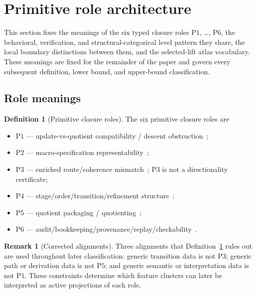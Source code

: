 \documentclass[11pt]{article}
\theoremstyle{definition}
\newtheorem{definition}[theorem]{Definition}
\newtheorem{remark}[theorem]{Remark}
\newcommand{\Pone}{\ensuremath{\mathrm{P1}}}
\newcommand{\Ptwo}{\ensuremath{\mathrm{P2}}}
\newcommand{\Pthree}{\ensuremath{\mathrm{P3}}}
\newcommand{\Pfour}{\ensuremath{\mathrm{P4}}}
\newcommand{\Pfive}{\ensuremath{\mathrm{P5}}}
\newcommand{\Psix}{\ensuremath{\mathrm{P6}}}
\begin{document}
 \section{Primitive role architecture}\label{sec:primitive-role-architecture}



This section fixes the meanings of the six typed closure roles
\Pone{}, \ldots, \Psix{}, the behavioral, verification, and
structural-categorical level pattern they share, the local boundary
distinctions between them, and the selected-lift atlas vocabulary.
These meanings are fixed for the remainder of the paper and govern
every subsequent definition, lower bound, and upper-bound
classification.

\subsection{Role meanings}\label{subsec:role-meanings}

\begin{definition}[Primitive closure roles]\label{def:primitive-roles}
The six primitive closure roles are
\begin{itemize}[topsep=2pt,itemsep=1pt]
  \item \Pone{} --- update-vs-quotient compatibility / descent
    obstruction~\citep{GrothendieckSGA1,JanelidzeTholen1994};
  \item \Ptwo{} --- macro-specification
    representability~\citep{MacLane1998};
  \item \Pthree{} --- enriched route/coherence
    mismatch~\citep{BaaderNipkow1998,Nakahara2003}; \Pthree{} is not a
    directionality certificate;
  \item \Pfour{} --- stage/order/transition/refinement
    structure~\citep{Milner1989,BackVonWright1998};
  \item \Pfive{} --- quotient packaging /
    quotienting~\citep{KemenySnell1960};
  \item \Psix{} --- audit/bookkeeping/provenance/replay/checkability~\citep{GreenKarvounarakisTannen2007,Merkle1987}.
\end{itemize}
\end{definition}

\begin{remark}[Corrected alignments]\label{rem:repaired-alignments}
Three alignments that Definition~\ref{def:primitive-roles} rules out
are used throughout later classification: generic transition data is
not \Pthree{}; generic path or derivation data is not \Pfive{}; and
generic semantic or interpretation data is not \Pone{}. These
constraints determine which feature clusters can later be interpreted
as active projections of each role.
\end{remark}
\end{document}

